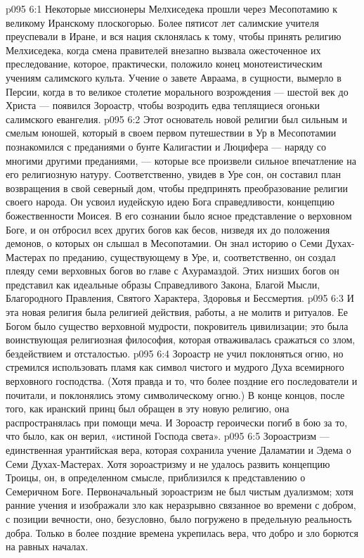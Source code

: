 \vs p095 6:1 Некоторые миссионеры Мелхиседека прошли через Месопотамию к великому Иранскому плоскогорью. Более пятисот лет салимские учителя преуспевали в Иране, и вся нация склонялась к тому, чтобы принять религию Мелхиседека, когда смена правителей внезапно вызвала ожесточенное их преследование, которое, практически, положило конец монотеистическим учениям салимского культа. Учение о завете Авраама, в сущности, вымерло в Персии, когда в то великое столетие морального возрождения --- шестой век до Христа --- появился Зороастр, чтобы возродить едва теплящиеся огоньки салимского евангелия.
\vs p095 6:2 Этот основатель новой религии был сильным и смелым юношей, который в своем первом путешествии в Ур в Месопотамии познакомился с преданиями о бунте Калигастии и Люцифера --- наряду со многими другими преданиями, --- которые все произвели сильное впечатление на его религиозную натуру. Соответственно, увидев в Уре сон, он составил план возвращения в свой северный дом, чтобы предпринять преобразование религии своего народа. Он усвоил иудейскую идею Бога справедливости, концепцию божественности Моисея. В его сознании было ясное представление о верховном Боге, и он отбросил всех других богов как бесов, низведя их до положения демонов, о которых он слышал в Месопотамии. Он знал историю о Семи Духах\hyp{}Мастерах по преданию, существующему в Уре, и, соответственно, он создал плеяду семи верховных богов во главе с Ахурамаздой. Этих низших богов он представил как идеальные образы Справедливого Закона, Благой Мысли, Благородного Правления, Святого Характера, Здоровья и Бессмертия.
\vs p095 6:3 И эта новая религия была религией действия, работы, а не молитв и ритуалов. Ее Богом было существо верховной мудрости, покровитель цивилизации; это была воинствующая религиозная философия, которая отваживалась сражаться со злом, бездействием и отсталостью.
\vs p095 6:4 Зороастр не учил поклоняться огню, но стремился использовать пламя как символ чистого и мудрого Духа всемирного верховного господства. (Хотя правда и то, что более поздние его последователи и почитали, и поклонялись этому символическому огню.) В конце концов, после того, как иранский принц был обращен в эту новую религию, она распространялась при помощи меча. И Зороастр героически погиб в бою за то, что было, как он верил, «истиной Господа света».
\vs p095 6:5 \pc Зороастризм --- единственная урантийская вера, которая сохранила учение Даламатии и Эдема о Семи Духах\hyp{}Мастерах. Хотя зороастризму и не удалось развить концепцию Троицы, он, в определенном смысле, приблизился к представлению о Семеричном Боге. Первоначальный зороастризм не был чистым дуализмом; хотя ранние учения и изображали зло как неразрывно связанное во времени с добром, с позиции вечности, оно, безусловно, было погружено в предельную реальность добра. Только в более поздние времена укрепилась вера, что добро и зло борются на равных началах.
